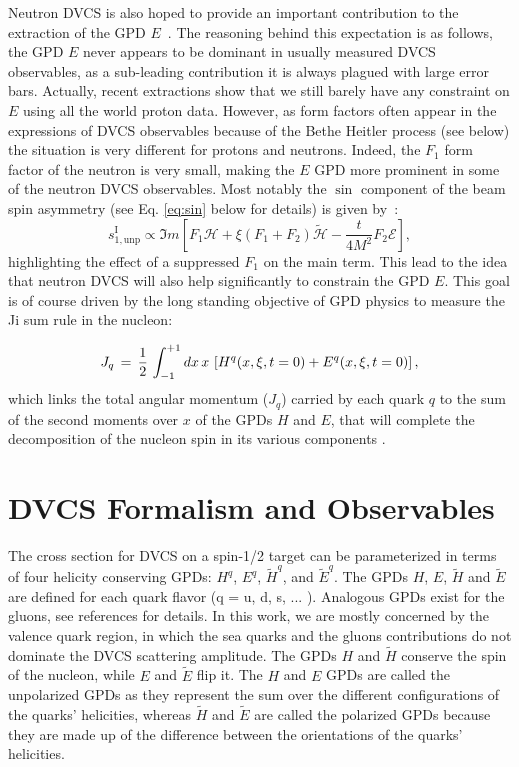 Neutron DVCS is also hoped to provide an important contribution to the 
extraction of the GPD $E$~\cite{dHose:2016mda}. The reasoning behind this expectation is as 
follows, the GPD $E$ never appears to be dominant in usually measured DVCS 
observables, as a sub-leading contribution it is always plagued with large 
error bars. Actually, recent extractions \cite{Dupre:2017hfs,Moutarde:2018kwr} show 
that we still barely have any constraint on $E$ using all the world proton 
data.  However, as form factors often appear in the expressions of
DVCS observables because of the Bethe Heitler process (see below) the situation 
is very different for protons and neutrons. Indeed, the $F_1$ form factor of the 
neutron is very small, making the $E$ GPD more prominent in some of the neutron DVCS 
observables. Most notably the $\sin$ component of the beam spin asymmetry 
(see Eq. \ref{eq:sin} below for details) is given 
by~\cite{dHose:2016mda}:
\begin{equation}
s^\textrm{I}_{1,\textrm{unp}} \propto \Im m \left [ 
F_1 \mathcal{H} + \xi(F_1 + F_2) \mathcal{\tilde H} - \frac{t}{4M^2} F_2  \mathcal{E} \right ],
\end{equation}
highlighting the effect of a suppressed $F_1$ on the main term.
This lead to the idea that neutron DVCS will also help significantly to constrain the 
GPD $E$. This goal is of course driven by the long standing objective of GPD physics to
measure the Ji sum rule in the nucleon:

\begin{equation}
J_q \,=\, {1 \over 2} \, \int_{-1}^{+1} d x \, x \, 
\left[ H^{q}(x,\xi,t = 0) + E^{q}(x,\xi,t = 0) \right],
\label{eq:dvcs_spin}
\end{equation}
which links the total angular momentum ($J_q$) carried by each quark $q$ to the 
sum of the second moments over $x$ of the GPDs $H$ and $E$, that will complete 
the decomposition of the nucleon spin in its various components 
\cite{PhysRevLett.78.610}. 

\section{DVCS Formalism and Observables}

The cross section for DVCS on a spin-1/2 target can be parameterized in terms 
of four helicity conserving GPDs: $H^q$, $E^q$, $\tilde{H}^q$, and 
$\tilde{E}^q$. The GPDs $H$, $E$, $\widetilde{H}$ and $\widetilde{E}$ are 
defined for each quark flavor (q = u, d, s, ... ). Analogous GPDs exist for the 
gluons, see references \cite{Ji:1996ek,PhysRevD.56.5524,Goeke:2001tz} for details.  In 
this work, we are mostly concerned by the valence quark region, in which the 
sea quarks and the gluons contributions do not dominate the DVCS scattering 
amplitude. The GPDs $H$ and $\widetilde{H}$ conserve the spin of the nucleon, 
while $E$ and $\widetilde{E}$ flip it. The $H$ and $E$ GPDs are called the 
unpolarized GPDs as they represent the sum over the different configurations of 
the quarks' helicities, whereas $\widetilde{H}$ and $\widetilde{E}$ are called 
the polarized GPDs because they are made up of the difference between the 
orientations of the quarks' helicities.

